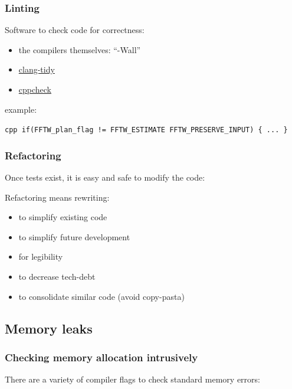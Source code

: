 \subsubsection{Linting}\label{linting}

Software to check code for correctness:

\begin{itemize}
\itemsep1pt\parskip0pt
\item
  the compilers themselves: ``-Wall''
\item
  \href{http://clang.llvm.org/extra/clang-tidy/}{clang-tidy}
\item
  \href{http://cppcheck.sourceforge.net/}{cppcheck}
\end{itemize}

example:

\texttt{cpp   if(FFTW\_plan\_flag != FFTW\_ESTIMATE \textbar{} FFTW\_PRESERVE\_INPUT) \{     ...   \}}

\subsubsection{Refactoring}\label{refactoring}

Once tests exist, it is easy and safe to modify the code:

Refactoring means rewriting:

\begin{itemize}
\itemsep1pt\parskip0pt
\item
  to simplify existing code
\item
  to simplify future development
\item
  for legibility
\item
  to decrease tech-debt
\item
  to consolidate similar code (avoid copy-pasta)
\end{itemize}

\subsection{Memory leaks}\label{memory-leaks}

\subsubsection{Checking memory allocation
intrusively}\label{checking-memory-allocation-intrusively}

There are a variety of compiler flags to check standard memory errors:

